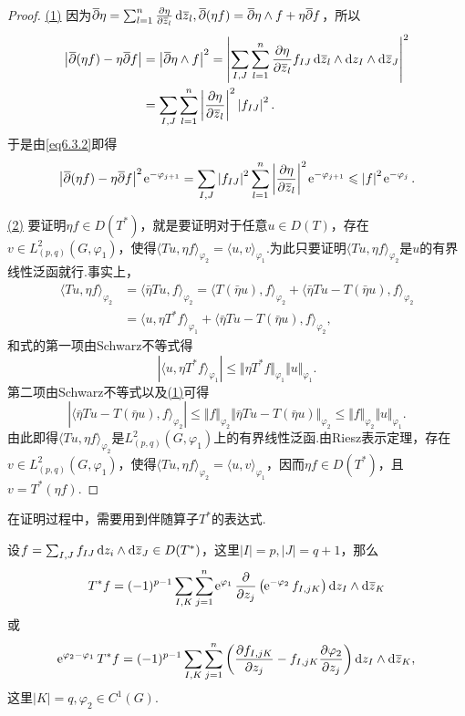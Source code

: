 \begin{proof}
	\hyperlink{6.3.2}{(1)}
	因为${}\mkern1mu\overline{\mkern-1mu\partial}\eta=\sum_{l=1}^{n}\frac{\partial \eta}{\partial {}\mkern1mu\overline{\mkern-1muz}_l}\mathop{}\!\mathrm d{}\mkern1mu\overline{\mkern-1muz}_l,{}\mkern1mu\overline{\mkern-1mu\partial}(\eta f)={}\mkern1mu\overline{\mkern-1mu\partial}\eta\wedge f+\eta{}\mkern1mu\overline{\mkern-1mu\partial}f$，所以
	\begin{align*}
		\left|{}\mkern1mu\overline{\mkern-1mu\partial}(\eta f)-\eta{}\mkern1mu\overline{\mkern-1mu\partial}f\right|
		&=\left|{}\mkern1mu\overline{\mkern-1mu\partial}\eta\wedge f\right|^2=\left|\sum_{I,J}\sum_{l=1}^n \frac{\partial \eta}{\partial {}\mkern1mu\overline{\mkern-1muz}_l}f_{IJ}\mathop{}\!\mathrm d{}\mkern1mu\overline{\mkern-1muz}_l\wedge\mathop{}\!\mathrm dz_I\wedge\mathop{}\!\mathrm d{}\mkern1mu\overline{\mkern-1muz}_J\right|^2\\
		&=\sum_{I,J}\sum_{l=1}^{n}\left|\frac{\partial \eta}{\partial {}\mkern1mu\overline{\mkern-1muz}_l}\right|^2\left|f_{IJ}\right|^2.
	\end{align*}
于是由\eqref{eq6.3.2}即得
\[\left|{}\mkern1mu\overline{\mkern-1mu\partial}(\eta f)-\eta{}\mkern1mu\overline{\mkern-1mu\partial}f\right|^2\operatorname{\!\!\;\mathrm e}^{-\varphi_{j+1}}=\sum_{I,J}\left|f_{IJ}\right|^2\sum_{l=1}^{n}\left|\frac{\partial \eta}{\partial {}\mkern1mu\overline{\mkern-1muz}_l}\right|^2\operatorname{\!\!\;\mathrm e}^{-\varphi_{j+1}}\leqslant\left|f\right|^2\operatorname{\!\!\;\mathrm e}^{-\varphi_j}.\]
	
	\hyperlink{6.3.2}{(2)}
	要证明$\eta f\in D(T^\ast)$，就是要证明对于任意$u\in D(T)$，存在$v\in L_{(p,q)}^2(G,\varphi_1)$，使得$\langle Tu,\eta f\rangle_{\varphi_2}=\langle u,v\rangle_{\varphi_1}$.为此只要证明$\langle Tu,\eta f\rangle_{\varphi_2}$是$u$的有界线性泛函就行.事实上，
	\begin{align*}
		\langle Tu,\eta f\rangle_{\varphi_2}
		&=\langle\bar{\eta}Tu,f\rangle_{\varphi_2}=\langle T(\bar{\eta}u),f\rangle_{\varphi_2}+\langle\bar{\eta}Tu-T(\bar{\eta}u),f\rangle_{\varphi_2}\\
		&=\langle u,\eta T^\ast f\rangle_{\varphi_1}+\langle\bar{\eta}Tu-T(\bar{\eta}u),f\rangle_{\varphi_2},
	\end{align*}
和式的第一项由Schwarz不等式得
\[|\langle u,\eta T^\ast f\rangle_{\varphi_1}|\le\Vert \eta T^\ast f\Vert_{\varphi_1}\Vert u\Vert_{\varphi_1}.\]
第二项由Schwarz不等式以及\hyperlink{6.3.2}{(1)}可得
\[\left|\langle\bar{\eta}Tu-T(\bar{\eta}u),f\rangle_{\varphi_2}\right|\le\Vert f\Vert_{\varphi_2}\Vert\bar{\eta}Tu-T(\bar{\eta}u)\Vert_{\varphi_2}\le\Vert f\Vert_{\varphi_2}\Vert u\Vert_{\varphi_1}.\]
由此即得$\langle Tu,\eta f\rangle_{\varphi_2}$是$L_{(p,q)}^2(G,\varphi_1)$上的有界线性泛函.由Riesz表示定理，存在$v\in L_{(p,q)}^2(G,\varphi_1)$，使得$\langle Tu,\eta f\rangle_{\varphi_2}=\langle u,v\rangle_{\varphi_1}$，因而$\eta f\in D(T^\ast)$，且$v=T^\ast(\eta f)$.
\end{proof}
在证明过程中，需要用到伴随算子$T^\ast$的表达式.
\begin{lemma}\label{lem6.3.3}
	设$f=\sum_{I,J}f_{IJ}\mathop{}\!\mathrm dz_i\wedge\mathop{}\!\mathrm d{}\mkern1mu\overline{\mkern-1muz}_J\in D(T^\ast)$，这里$|I|=p,|J|=q+1$，那么
	\begin{equation}\label{eq6.3.4}
		T^\ast f=(-1)^{p-1}\sum_{I,K}\sum_{j=1}^{n}\operatorname{\!\!\;\mathrm e}^{\varphi_1}\frac{\partial }{\partial z_j}\left(\operatorname{\!\!\;\mathrm e}^{-\varphi_2}f_{I,jK}\right)\mathop{}\!\mathrm dz_I\wedge\mathop{}\!\mathrm d{}\mkern1mu\overline{\mkern-1muz}_K
	\end{equation}
或
\begin{equation}\label{eq6.3.5}
	\operatorname{\!\!\;\mathrm e}^{\varphi_2-\varphi_1}T^\ast f=(-1)^{p-1}\sum_{I,K}\sum_{j=1}^{n}\left(\frac{\partial f_{I,jK}}{\partial z_j}-f_{I,jK}\frac{\partial \varphi_2}{\partial z_j}\right)\mathop{}\!\mathrm dz_I\wedge\mathop{}\!\mathrm d{}\mkern1mu\overline{\mkern-1muz}_K,
\end{equation}
这里$|K|=q,\varphi_2\in C^1(G)$.
\end{lemma}
